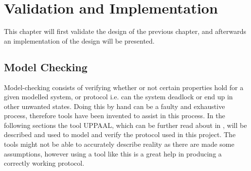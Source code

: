 \chapter{Validation and Implementation}\label{cha:validationAndImplementation}
This chapter will first validate the design of the previous chapter, and afterwards an implementation of the design will be presented.

\section{Model Checking}

Model-checking consists of verifying whether or not certain properties hold for a given modelled system, or protocol i.e. can the system deadlock or end up in other unwanted states.
Doing this by hand can be a faulty and exhaustive process, therefore tools have been invented to assist in this process. In the following sections the tool UPPAAL, which can be further read about in \cite{UPPAAL}, will be described and used to model and verify the protocol used in this project. 
The tools might not be able to accurately describe reality as there are made some assumptions, however using a tool like this is a great help in producing a correctly working protocol. 



